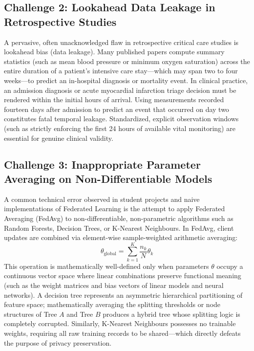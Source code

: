 \documentclass[12pt,a4paper,oneside]{report}
\begin{document}
\subsection{Challenge 2: Lookahead Data Leakage in Retrospective Studies}
A pervasive, often unacknowledged flaw in retrospective critical care studies is lookahead bias (data leakage). Many published papers compute summary statistics (such as mean blood pressure or minimum oxygen saturation) across the entire duration of a patient's intensive care stay—which may span two to four weeks—to predict an in-hospital diagnosis or mortality event. In clinical practice, an admission diagnosis or acute myocardial infarction triage decision must be rendered within the initial hours of arrival. Using measurements recorded fourteen days after admission to predict an event that occurred on day two constitutes fatal temporal leakage. Standardized, explicit observation windows (such as strictly enforcing the first 24 hours of available vital monitoring) are essential for genuine clinical validity.

\subsection{Challenge 3: Inappropriate Parameter Averaging on Non-Differentiable Models}
A common technical error observed in student projects and naive implementations of Federated Learning is the attempt to apply Federated Averaging (FedAvg) to non-differentiable, non-parametric algorithms such as Random Forests, Decision Trees, or K-Nearest Neighbours. In FedAvg, client updates are combined via element-wise sample-weighted arithmetic averaging:
\begin{equation}
\theta_{\text{global}} = \sum_{k=1}^K \frac{n_k}{N} \theta_k
\end{equation}
This operation is mathematically well-defined only when parameters $\theta$ occupy a continuous vector space where linear combinations preserve functional meaning (such as the weight matrices and bias vectors of linear models and neural networks). A decision tree represents an asymmetric hierarchical partitioning of feature space; mathematically averaging the splitting thresholds or node structures of Tree $A$ and Tree $B$ produces a hybrid tree whose splitting logic is completely corrupted. Similarly, K-Nearest Neighbours possesses no trainable weights, requiring all raw training records to be shared—which directly defeats the purpose of privacy preservation.
\end{document}
